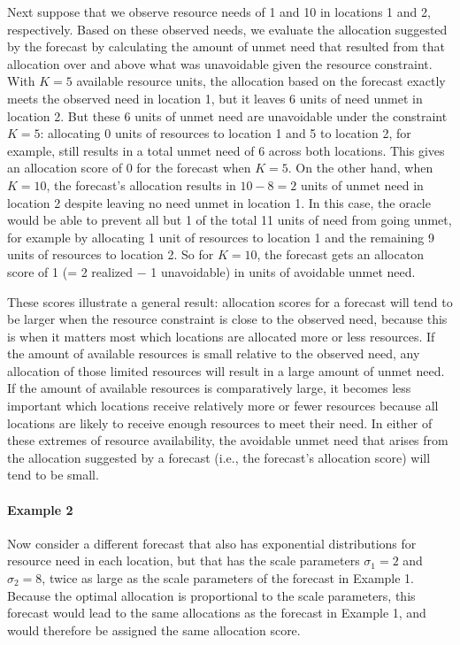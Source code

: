 \documentclass{article}
\begin{document}
Next suppose that we observe resource needs of 1 and 10 in locations 1 and 2, respectively. Based on these observed
needs, we evaluate the allocation suggested by the forecast by calculating the amount of unmet need that resulted from
that allocation over and above what was unavoidable given the resource constraint. With $K = 5$ available resource
units, the allocation based on the forecast exactly meets the observed need in location 1, but it leaves 6 units of need
unmet in location 2. But these 6 units of unmet need are unavoidable under the constraint $K=5$: allocating 0 units of
resources to location 1 and 5 to location 2, for example, still results in a total unmet need of 6 across both
locations. This gives an allocation score of 0 for the forecast when $K = 5$. On the other hand, when $K = 10$, the
forecast's allocation results in $10 - 8 = 2$ units of unmet need in location 2 despite leaving no need unmet in
location 1. In this case, the oracle would be able to prevent all but 1 of the total 11 units of need from going unmet,
for example by allocating 1 unit of resources to location 1 and the remaining 9 units of resources to location 2. So for
$K = 10$, the forecast gets an allocaton score of 1 (= 2 realized $-$ 1 unavoidable) in units of avoidable unmet need.

These scores illustrate a general result: allocation scores for a forecast will tend to be larger when the resource
constraint is close to the observed need, because this is when it matters most which locations are allocated more or
less resources. If the amount of available resources is small relative to the observed need, any allocation of those
limited resources will result in a large amount of unmet need. If the amount of available resources is comparatively
large, it becomes less important which locations receive relatively more or fewer resources because all locations are
likely to
receive enough resources to meet their need. In either of these extremes of resource availability, the avoidable unmet
need that arises from the allocation suggested by a forecast (i.e., the forecast's allocation score) will tend to be
small.

\paragraph{Example 2} \label{examp2} Now consider a different forecast that also has exponential distributions for resource need in
each location, but that has the scale parameters $\sigma_1 = 2$ and $\sigma_2 = 8$, twice as large as the scale
parameters of the forecast in Example 1. Because the optimal allocation is proportional to the scale parameters, this
forecast would lead to the same allocations as the forecast in Example 1, and would therefore be assigned the same
allocation score.
\end{document}

